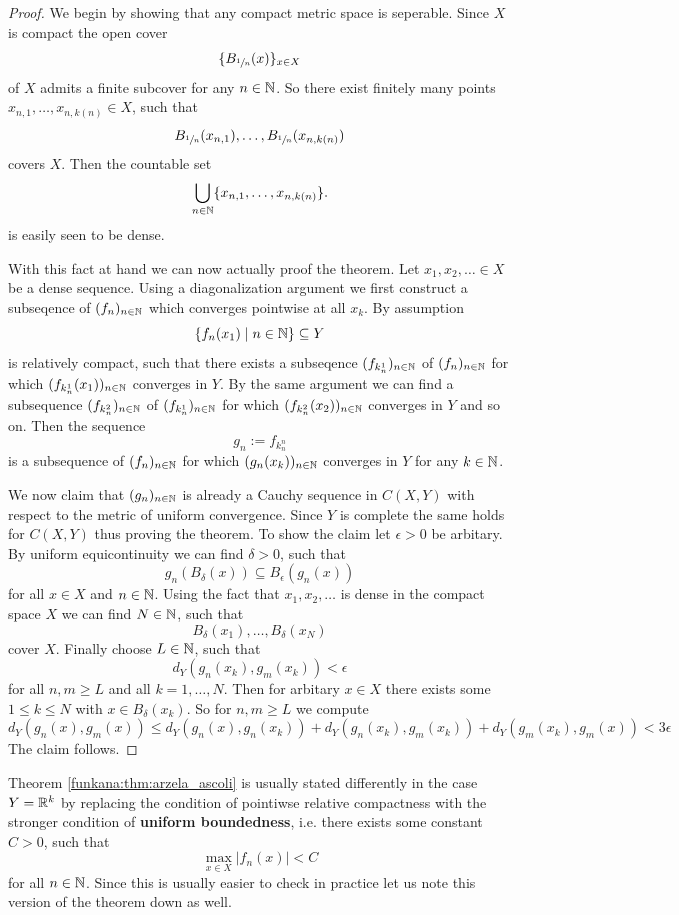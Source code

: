 \begin{proof}
    We begin by showing that any compact metric space is seperable. Since $X$ is compact the open cover 
    \[
    \{B_{\sfrac{1}{n}}(x)\}_{x\in X}
    \]
    of $X$ admits a finite subcover for any $n\in\mathbb{N}$. So there exist finitely many points $x_{n,1},\ldots,x_{n,k(n)} \in X$, such that 
    \[
    B_{\sfrac{1}{n}}(x_{n,1}),\ldots,B_{\sfrac{1}{n}}(x_{n,k(n)})
    \]
    covers $X$. Then the countable set 
    \[
    \bigcup_{n\in\mathbb{N}}\{x_{n,1},\ldots,x_{n,k(n)}\}.
    \]
    is easily seen to be dense. 
    
    With this fact at hand we can now actually proof the theorem. Let $x_1, x_2, \ldots \in X$ be a dense sequence. Using a diagonalization argument we first construct a subseqence of $(f_n)_{n\in\mathbb{N}}$ which converges pointwise at all $x_k$. By assumption 
    \[
    \{f_n(x_1) \mid n \in \mathbb{N}\} \subseteq Y
    \]
    is relatively compact, such that there exists a subseqence $(f_{k^1_n})_{n\in\mathbb{N}}$ of $(f_n)_{n\in\mathbb{N}}$ for which $(f_{k^1_n}(x_1))_{n\in\mathbb{N}}$ converges in $Y$. By the same argument we can find a subsequence $(f_{k^2_n})_{n\in\mathbb{N}}$ of $(f_{k^1_n})_{n\in\mathbb{N}}$ for which $(f_{k^2_n}(x_2))_{n\in\mathbb{N}}$ converges in $Y$ and so on. Then the sequence 
    \[
    g_n := f_{k_n^n}
    \]
    is a subsequence of $(f_n)_{n\in\mathbb{N}}$ for which $(g_n(x_k))_{n\in\mathbb{N}}$ converges in $Y$ for any $k\in\mathbb{N}$. 
    
    We now claim that $(g_n)_{n\in\mathbb{N}}$ is already a Cauchy sequence in $C(X,Y)$ with respect to the metric of uniform convergence. Since $Y$ is complete the same holds for $C(X,Y)$ thus proving the theorem. To show the claim let $\epsilon>0$ be arbitary. By uniform equicontinuity we can find $\delta>0$, such that 
    \[
    g_n(B_\delta(x)) \subseteq B_\epsilon(g_n(x))
    \]
    for all $x\in X$ and $n\in \mathbb{N}$. Using the fact that $x_1,x_2,\ldots$ is dense in the compact space $X$ we can find $N\in\mathbb{N}$, such that
    \[
    B_\delta(x_1),\ldots,B_\delta(x_N)
    \]
    cover $X$. Finally choose $L\in\mathbb{N}$, such that 
    \[
    d_Y(g_n(x_k),g_m(x_k)) < \epsilon
    \]
    for all $n,m \geq L$ and all $k=1,\ldots,N$. Then for arbitary $x\in X$ there exists some $1\leq k\leq N$ with $x\in B_\delta(x_k)$. So for $n,m \geq L$ we compute 
    \[
    d_Y(g_n(x),g_m(x)) \leq  d_Y(g_n(x),g_n(x_k)) +  d_Y(g_n(x_k),g_m(x_k)) +  d_Y(g_m(x_k),g_m(x)) < 3\epsilon
    \]
    The claim follows.
\end{proof}

Theorem \ref{funkana:thm:arzela_ascoli} is usually stated differently in the case $Y = \mathbb{R}^k$ by replacing the condition of pointiwse relative compactness with the stronger condition of \textbf{uniform boundedness}, i.e. there exists some constant $C>0$, such that 
\[
\max_{x\in X} |f_n(x)| < C
\]
for all $n\in \mathbb{N}$. Since this is usually easier to check in practice let us note this version of the theorem down as well. 

